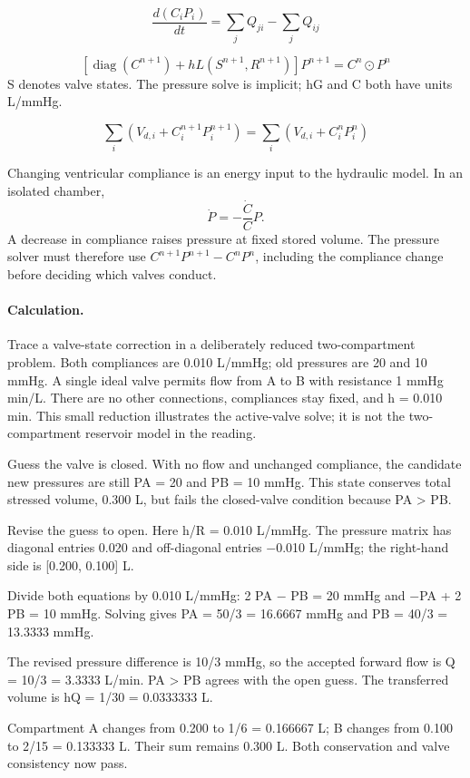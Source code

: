 \documentclass[11pt,letterpaper]{article}
\theoremstyle{definition}\newtheorem{definition}{Definition}\newtheorem{example}{Example}
\numberwithin{equation}{section}
\begin{document}
\[
\frac{d(C_iP_i)}{dt}=\sum_j Q_{ji}-\sum_j Q_{ij}
\]


\[
\left[\operatorname{diag}(C^{n+1})+hL(S^{n+1},R^{n+1})\right]P^{n+1}=C^n\mathbin{\odot}P^n
\]
S denotes valve states. The pressure solve is implicit; hG and C both have units L/mmHg.

\[
\sum_i(V_{d,i}+C_i^{n+1}P_i^{n+1})=\sum_i(V_{d,i}+C_i^nP_i^n)
\]


Changing ventricular compliance is an energy input to the hydraulic model. In an isolated chamber,
\[
 \dot P=-\frac{\dot C}{C}P.
\]
A decrease in compliance raises pressure at fixed stored volume. The pressure solver must therefore use $C^{n+1}P^{n+1}-C^nP^n$, including the compliance change before deciding which valves conduct.

\paragraph{Calculation.} Trace a valve-state correction in a deliberately reduced two-compartment problem. Both compliances are 0.010 L/mmHg; old pressures are 20 and 10 mmHg. A single ideal valve permits flow from A to B with resistance 1 mmHg min/L. There are no other connections, compliances stay fixed, and h = 0.010 min. This small reduction illustrates the active-valve solve; it is not the two-compartment reservoir model in the reading.

Guess the valve is closed. With no flow and unchanged compliance, the candidate new pressures are still PA = 20 and PB = 10 mmHg. This state conserves total stressed volume, 0.300 L, but fails the closed-valve condition because PA > PB.

Revise the guess to open. Here h/R = 0.010 L/mmHg. The pressure matrix has diagonal entries 0.020 and off-diagonal entries \ensuremath{-}0.010 L/mmHg; the right-hand side is [0.200, 0.100] L.

Divide both equations by 0.010 L/mmHg: 2 PA \ensuremath{-} PB = 20 mmHg and \ensuremath{-}PA + 2 PB = 10 mmHg. Solving gives PA = 50/3 = 16.6667 mmHg and PB = 40/3 = 13.3333 mmHg.

The revised pressure difference is 10/3 mmHg, so the accepted forward flow is Q = 10/3 = 3.3333 L/min. PA > PB agrees with the open guess. The transferred volume is hQ = 1/30 = 0.0333333 L.

Compartment A changes from 0.200 to 1/6 = 0.166667 L; B changes from 0.100 to 2/15 = 0.133333 L. Their sum remains 0.300 L. Both conservation and valve consistency now pass.
\end{document}
